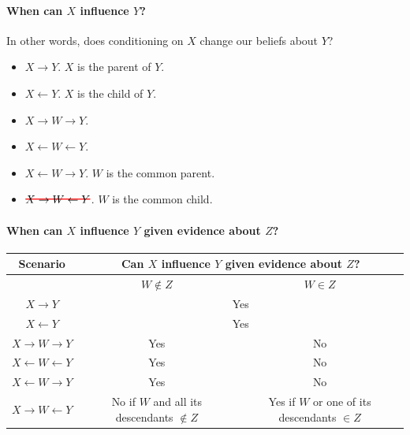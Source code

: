 \documentclass[12pt]{article}
\newcommand\hcancel[2][black]{\setbox0=\hbox{$#2$}
\rlap{\raisebox{.45\ht0}{\textcolor{#1}{\rule{\wd0}{1pt}}}}#2}
\begin{document}
\paragraph{When can $X$ influence $Y$?} In other words, does conditioning on $X$ change our beliefs about $Y$?

\begin{itemize}
  \item $X \rightarrow Y$. $X$ is the parent of $Y$.

  \item $X \leftarrow Y$. $X$ is the child of $Y$.

  \item $X \rightarrow W \rightarrow Y$.

  \item $X \leftarrow W \leftarrow Y$.

  \item $X \leftarrow W \rightarrow Y$. $W$ is the common parent.

  \item $\hcancel[red]{X \rightarrow W \leftarrow Y}$. $W$ is the common child.

\end{itemize}

\paragraph{When can $X$ influence $Y$ given evidence about $Z$?}

\begin{center}
\begin{tabular}{|c|c|c|}
    \hline
    Scenario & \multicolumn{2}{|c|}{Can $X$ influence $Y$ given evidence about $Z$?} \\ \hline
     & $W \not\in Z$ & $W \in Z$  \\ \hline

    $X \rightarrow Y$ & \multicolumn{2}{|c|}{Yes} \\

    $X \leftarrow Y$ & \multicolumn{2}{|c|}{Yes} \\

    $X \rightarrow W \rightarrow Y$ & Yes & No \\

    $X \leftarrow W \leftarrow Y$ & Yes & No \\

    $X \leftarrow W \rightarrow Y$ & Yes & No \\

    $X \rightarrow W \leftarrow Y$ & No if $W$ and all its descendants $\not\in Z$ & Yes if $W$ or one of its descendants $\in Z$\\
    \hline
  \end{tabular}
\end{center}
\end{document}
